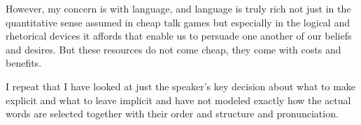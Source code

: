 However, my concern is with language, and language is truly rich not just in the quantitative sense assumed in cheap talk games but especially in the logical and rhetorical devices it affords that enable us to persuade one another of our beliefs and desires. But these resources do not come cheap, they come with costs and benefits. 

I repeat that I have looked at just the speaker's key decision about what to make explicit and what to leave implicit and have not modeled exactly how the actual words are selected together with their order and structure and pronunciation.

